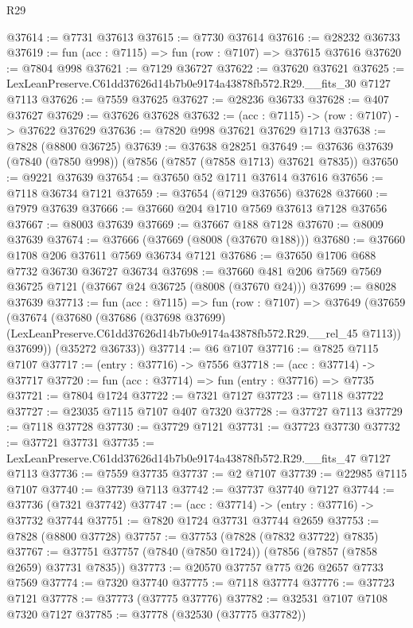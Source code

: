 \begin{lexlean}{R29}
\begin{coremodule}
@37614 := @7731 @37613
@37615 := @7730 @37614
@37616 := @28232 @36733
@37619 := fun (acc : @7115) => fun (row : @7107) => @37615 @37616
@37620 := @7804 @998
@37621 := @7129 @36727
@37622 := @37620 @37621
@37625 := LexLeanPreserve.C61dd37626d14b7b0e9174a43878fb572.R29.__fits_30 @7127 @7113
@37626 := @7559 @37625
@37627 := @28236 @36733
@37628 := @407 @37627
@37629 := @37626 @37628
@37632 := (acc : @7115) -> (row : @7107) -> @37622 @37629
@37636 := @7820 @998 @37621 @37629 @1713
@37638 := @7828 (@8800 @36725)
@37639 := @37638 @28251
@37649 := @37636 @37639 (@7840 (@7850 @998)) (@7856 (@7857 (@7858 @1713) @37621 @7835))
@37650 := @9221 @37639
@37654 := @37650 @52 @1711 @37614 @37616
@37656 := @7118 @36734 @7121
@37659 := @37654 (@7129 @37656) @37628
@37660 := @7979 @37639
@37666 := @37660 @204 @1710 @7569 @37613 @7128 @37656
@37667 := @8003 @37639
@37669 := @37667 @188 @7128
@37670 := @8009 @37639
@37674 := @37666 (@37669 (@8008 (@37670 @188)))
@37680 := @37660 @1708 @206 @37611 @7569 @36734 @7121
@37686 := @37650 @1706 @688 @7732 @36730 @36727 @36734
@37698 := @37660 @481 @206 @7569 @7569 @36725 @7121 (@37667 @24 @36725 (@8008 (@37670 @24)))
@37699 := @8028 @37639
@37713 := fun (acc : @7115) =>
  fun (row : @7107) =>
  @37649
    (@37659
      (@37674
        (@37680
          (@37686
            (@37698 @37699)
            (LexLeanPreserve.C61dd37626d14b7b0e9174a43878fb572.R29.__rel_45 @7113))
          @37699))
      (@35272 @36733))
@37714 := @6 @7107
@37716 := @7825 @7115 @7107
@37717 := (entry : @37716) -> @7556
@37718 := (acc : @37714) -> @37717
@37720 := fun (acc : @37714) => fun (entry : @37716) => @7735
@37721 := @7804 @1724
@37722 := @7321 @7127
@37723 := @7118 @37722
@37727 := @23035 @7115 @7107 @407 @7320
@37728 := @37727 @7113
@37729 := @7118 @37728
@37730 := @37729 @7121
@37731 := @37723 @37730
@37732 := @37721 @37731
@37735 := LexLeanPreserve.C61dd37626d14b7b0e9174a43878fb572.R29.__fits_47 @7127 @7113
@37736 := @7559 @37735
@37737 := @2 @7107
@37739 := @22985 @7115 @7107
@37740 := @37739 @7113
@37742 := @37737 @37740 @7127
@37744 := @37736 (@7321 @37742)
@37747 := (acc : @37714) -> (entry : @37716) -> @37732 @37744
@37751 := @7820 @1724 @37731 @37744 @2659
@37753 := @7828 (@8800 @37728)
@37757 := @37753 (@7828 (@7832 @37722) @7835)
@37767 := @37751 @37757 (@7840 (@7850 @1724)) (@7856 (@7857 (@7858 @2659) @37731 @7835))
@37773 := @20570 @37757 @775 @26 @2657 @7733 @7569
@37774 := @7320 @37740
@37775 := @7118 @37774
@37776 := @37723 @7121
@37778 := @37773 (@37775 @37776)
@37782 := @32531 @7107 @7108 @7320 @7127
@37785 := @37778 (@32530 (@37775 @37782))

\end{coremodule}
\end{lexlean}
